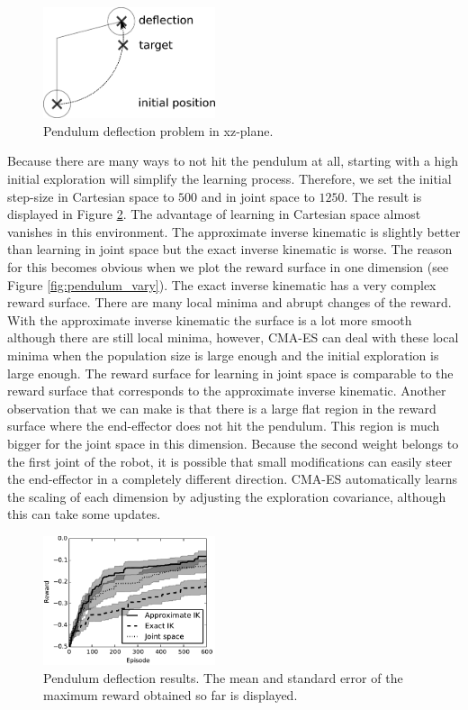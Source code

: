 \documentclass{article}
\begin{document}

\begin{figure}[tb]
\includegraphics[width=0.45\textwidth]{pendulum}
\centering
\caption{
Pendulum deflection problem in xz-plane.
}
\label{fig:pendulum}
\end{figure}

Because there are many ways to not hit the pendulum at all, starting with
a high initial exploration will simplify the learning process. Therefore,
we set the initial step-size in Cartesian space to $500$ and in joint space
to $1250$.
The result is displayed in Figure \ref{fig:pendulum_res}. The advantage of
learning in Cartesian space almost vanishes in this environment. The
approximate inverse kinematic is slightly better than learning in joint
space but the exact inverse kinematic is worse. The reason for this becomes
obvious when we plot the reward surface in one dimension (see Figure
\ref{fig:pendulum_vary}).
The exact inverse kinematic has a very complex reward surface. There are
many local minima and abrupt changes of the reward. With the approximate
inverse kinematic the surface is a lot more smooth although there are still
local minima, however, CMA-ES can deal with these local minima when the
population size is large enough and the initial exploration is large enough.
The reward surface for learning in joint space is comparable to the
reward surface that corresponds to the approximate inverse kinematic.
Another observation that we can make is that there is a large flat
region in the reward surface where the end-effector does not hit the
pendulum. This region is much bigger for the joint space in this
dimension. Because the second weight belongs to the first joint of the
robot, it is possible that small modifications can easily steer the
end-effector in a completely different direction. CMA-ES automatically
learns the scaling of each dimension by adjusting the exploration
covariance, although this can take some updates.

\begin{figure}[tb]
\includegraphics[width=0.45\textwidth]{result_comparison_pendulum}
\centering
\caption{
Pendulum deflection results. The mean and standard error of the maximum reward
obtained so far is displayed.
}
\label{fig:pendulum_res}
\end{figure}
\end{document}
